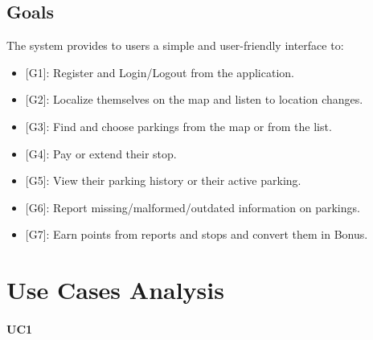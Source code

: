 \documentclass[11pt]{article} %
\begin{document}
\subsection{Goals}
The system provides to users a simple and user-friendly interface to:
\begin{itemize}
  \item {}[G1]: Register and Login/Logout from the application.
  \item {}[G2]: Localize themselves on the map and listen to location changes.
  \item {}[G3]: Find and choose parkings from the map or from the list.
  \item {}[G4]: Pay or extend their stop.
  \item {}[G5]: View their parking history or their active parking.
  \item {}[G6]: Report missing/malformed/outdated information on parkings.
  \item {}[G7]: Earn points from reports and stops and convert them in Bonus.
  
\end{itemize}

\section{Use Cases Analysis}
\paragraph{UC1}
\end{document}
